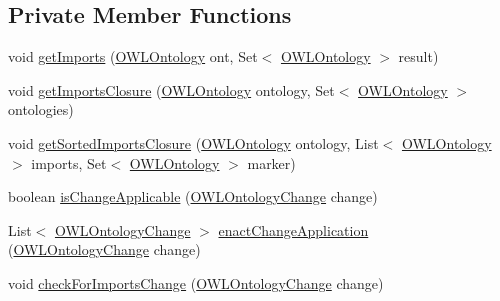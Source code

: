 \subsection*{Private Member Functions}
\begin{DoxyCompactItemize}
\item 
void \hyperlink{classuk_1_1ac_1_1manchester_1_1cs_1_1owl_1_1owlapi_1_1_o_w_l_ontology_manager_impl_aa2484065ea053b37392204808a86f2c1}{get\-Imports} (\hyperlink{interfaceorg_1_1semanticweb_1_1owlapi_1_1model_1_1_o_w_l_ontology}{O\-W\-L\-Ontology} ont, Set$<$ \hyperlink{interfaceorg_1_1semanticweb_1_1owlapi_1_1model_1_1_o_w_l_ontology}{O\-W\-L\-Ontology} $>$ result)
\item 
void \hyperlink{classuk_1_1ac_1_1manchester_1_1cs_1_1owl_1_1owlapi_1_1_o_w_l_ontology_manager_impl_a0b9094b0af821579e5bea3cc8ff60399}{get\-Imports\-Closure} (\hyperlink{interfaceorg_1_1semanticweb_1_1owlapi_1_1model_1_1_o_w_l_ontology}{O\-W\-L\-Ontology} ontology, Set$<$ \hyperlink{interfaceorg_1_1semanticweb_1_1owlapi_1_1model_1_1_o_w_l_ontology}{O\-W\-L\-Ontology} $>$ ontologies)
\item 
void \hyperlink{classuk_1_1ac_1_1manchester_1_1cs_1_1owl_1_1owlapi_1_1_o_w_l_ontology_manager_impl_a82c7da7dca55e6b2dbe6ae5270c509c0}{get\-Sorted\-Imports\-Closure} (\hyperlink{interfaceorg_1_1semanticweb_1_1owlapi_1_1model_1_1_o_w_l_ontology}{O\-W\-L\-Ontology} ontology, List$<$ \hyperlink{interfaceorg_1_1semanticweb_1_1owlapi_1_1model_1_1_o_w_l_ontology}{O\-W\-L\-Ontology} $>$ imports, Set$<$ \hyperlink{interfaceorg_1_1semanticweb_1_1owlapi_1_1model_1_1_o_w_l_ontology}{O\-W\-L\-Ontology} $>$ marker)
\item 
boolean \hyperlink{classuk_1_1ac_1_1manchester_1_1cs_1_1owl_1_1owlapi_1_1_o_w_l_ontology_manager_impl_a7de4d6193b074a788f2e28ba1906b813}{is\-Change\-Applicable} (\hyperlink{classorg_1_1semanticweb_1_1owlapi_1_1model_1_1_o_w_l_ontology_change}{O\-W\-L\-Ontology\-Change} change)
\item 
List$<$ \hyperlink{classorg_1_1semanticweb_1_1owlapi_1_1model_1_1_o_w_l_ontology_change}{O\-W\-L\-Ontology\-Change} $>$ \hyperlink{classuk_1_1ac_1_1manchester_1_1cs_1_1owl_1_1owlapi_1_1_o_w_l_ontology_manager_impl_a4dea506b4697b043c229f5a792a725a6}{enact\-Change\-Application} (\hyperlink{classorg_1_1semanticweb_1_1owlapi_1_1model_1_1_o_w_l_ontology_change}{O\-W\-L\-Ontology\-Change} change)
\item 
void \hyperlink{classuk_1_1ac_1_1manchester_1_1cs_1_1owl_1_1owlapi_1_1_o_w_l_ontology_manager_impl_a4632436d8545571ae76d936c4abfa6e6}{check\-For\-Imports\-Change} (\hyperlink{classorg_1_1semanticweb_1_1owlapi_1_1model_1_1_o_w_l_ontology_change}{O\-W\-L\-Ontology\-Change} change)

\end{DoxyCompactItemize}
